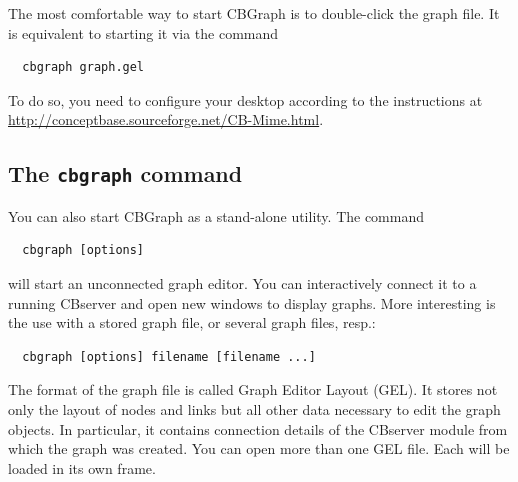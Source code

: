 The most comfortable way to start CBGraph is to double-click the graph file. It is equivalent
to starting it via the command 

{\small
\begin{verbatim}
  cbgraph graph.gel
\end{verbatim}
}

To do so, you need to configure your desktop according to the instructions at
\url{http://conceptbase.sourceforge.net/CB-Mime.html}.



\subsection{The {\tt cbgraph} command}
\label{sec:cbgraphcmd}
You can also start CBGraph as a stand-alone utility. The command

{\small
\begin{verbatim}
  cbgraph [options]
\end{verbatim}
}

will start an unconnected graph editor. You can interactively connect it to a running CBserver
and open new windows to display graphs. More interesting is the use with a stored graph file,
or several graph files, resp.:

{\small
\begin{verbatim}
  cbgraph [options] filename [filename ...]
\end{verbatim}
}

The format of the graph file is called Graph Editor Layout (GEL). It stores not only the layout of nodes
and links but all other data necessary to edit the graph objects. In particular, it contains
connection details of the CBserver module from which the graph was created. You can open more than one
GEL file. Each will be loaded in its own frame. 

